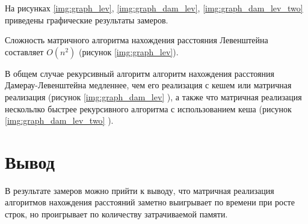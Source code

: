 На рисунках \ref{img:graph_lev}, \ref{img:graph_dam_lev}, \ref{img:graph_dam_lev_two} приведены графические результаты замеров.



\clearpage

Сложность матричного алгоритма нахождения расстояния Левенштейна составляет $O(n^2)$ (рисунок \ref{img:graph_lev}).

В общем случае рекурсивный алгоритм алгоритм нахождения расстояния Дамерау-Левенштейна медленнее, чем его реализация с кешем или матричная реализация (рисунок \ref{img:graph_dam_lev} ), а также что матричная реализация нескольлко быстрее рекурсивного алгоритма с использованием кеша (рисунок \ref{img:graph_dam_lev_two} ).


\section{Вывод}

В результате замеров можно прийти к выводу, что матричная реализация алгоритмов нахождения расстояний заметно выигрывает по времени при росте строк, но проигрывает по количеству затрачиваемой памяти.